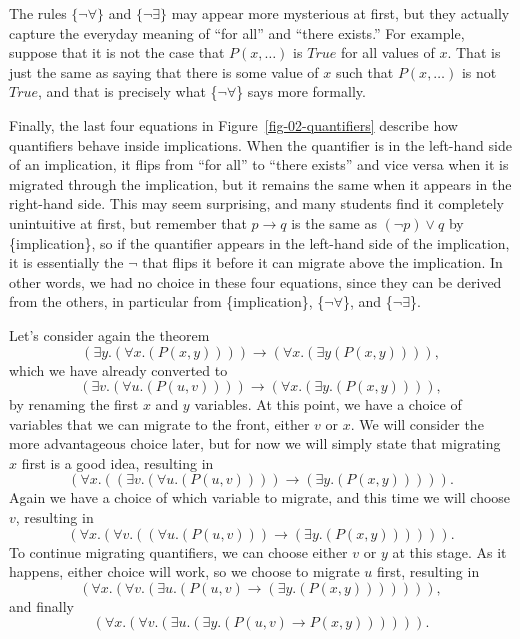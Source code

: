 {{The rules $\{\neg\forall\}$ and $\{\neg\exists\}$ may appear more mysterious at first, but they actually
capture the everyday meaning of ``for all'' and ``there exists.'' For example, suppose that it is not
the case that $P(x,\dots)$ is $True$ for all values of $x$. That is just the same as saying that there
is some value of $x$ such that $P(x,\dots)$ is not $True$, and that is precisely what 
\{$\neg\forall$\} says more formally.

Finally, the last four equations in Figure~\ref{fig-02-quantifiers} describe how quantifiers behave
inside implications. When the quantifier is in the left-hand side of an implication, it flips from
``for all'' to ``there exists'' and vice versa when it is migrated through the implication, but it remains the same when it appears in the right-hand side. This may seem surprising, and many students
find it completely unintuitive at first, but remember that $p \rightarrow q$ is the same as
$(\neg p) \vee q$ by \{implication\}, so if the quantifier appears in the left-hand side of
the implication, it is essentially the $\neg$ that flips it before it can migrate above the
implication. In other words, we had no choice in these four equations, since they can be derived
from the others, in particular from \{implication\}, \{$\neg\forall$\}, and \{$\neg\exists$\}.

Let's consider again the theorem 
$$(\exists y.(\forall x.(P(x, y)))) \rightarrow (\forall x.(\exists y (P(x, y)))),$$
which we have already converted to
$$(\exists v.(\forall u.(P(u, v)))) \rightarrow (\forall x.(\exists y.(P(x, y)))),$$
by renaming the first $x$ and $y$ variables. At this point, we have a choice of variables that
we can migrate to the front, either $v$ or $x$. We will consider the more advantageous choice
later, but for now we will simply state that migrating $x$ first is a good idea, resulting in
$$(\forall x.((\exists v.(\forall u.(P(u, v)))) \rightarrow (\exists y.(P(x, y))))).$$
Again we have a choice of which variable to migrate, and this time we will choose $v$, resulting in
$$(\forall x.(\forall v.((\forall u.(P(u, v))) \rightarrow (\exists y.(P(x, y)))))).$$
To continue migrating quantifiers, we can choose either $v$ or $y$ at this stage. As it happens,
either choice will work, so we choose to migrate $u$ first, resulting in
$$(\forall x.(\forall v.(\exists u.(P(u, v) \rightarrow (\exists y.(P(x, y))))))),$$
and finally
$$(\forall x.(\forall v.(\exists u.(\exists y.(P(u, v) \rightarrow P(x, y)))))).$$

}}
